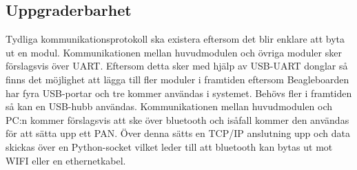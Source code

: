 \subsection{Uppgraderbarhet}
Tydliga kommunikationsprotokoll ska existera eftersom det blir enklare att byta ut en modul. Kommunikationen mellan huvudmodulen och övriga moduler sker förslagsvis över UART. Eftersom detta sker med hjälp av USB-UART donglar så finns det möjlighet att lägga till fler moduler i framtiden eftersom Beagleboarden har fyra USB-portar och tre kommer användas i systemet. Behövs fler i framtiden så kan en USB-hubb användas.
\newline
\newline
Kommunikationen mellan huvudmodulen och PC:n kommer förslagsvis att ske över bluetooth och isåfall kommer den användas för att sätta upp ett PAN. Över denna sätts en TCP/IP anslutning upp och data skickas över en Python-socket vilket leder till att bluetooth kan bytas ut mot WIFI eller en ethernetkabel.
